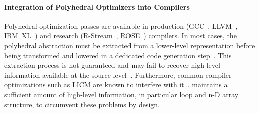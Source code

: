 

\paragraph{Integration of Polyhedral Optimizers into Compilers}

Polyhedral optimization passes are available in production (GCC~\cite{pop2006graphite}, LLVM~\cite{grosser.ppl.2012}, IBM~XL~\cite{ibmxl_polyhedral}) and research (R-Stream~\cite{rstream}, ROSE~\cite{quinlan2000rose}) compilers. In most cases, the polyhedral abstraction must be extracted from a lower-level representation before being transformed and lowered in a dedicated code generation step~\cite{cloog,grosser2015polyhedral}. This extraction process is not guaranteed and may fail to recover high-level information available at the source level~\cite{delinearization}. Furthermore, common compiler optimizations such as LICM are known to interfere with it~\cite{delicm}. \tool maintains a sufficient amount of high-level information, in particular loop and n-D array structure, to circumvent these problems by design.

